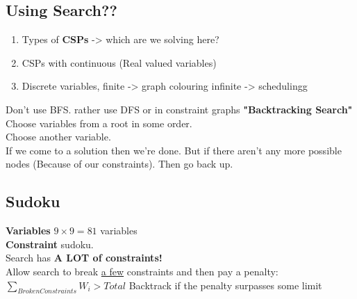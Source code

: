\documentclass{article}
\begin{document}
\subsection{Using Search??}
\begin{enumerate}
	\item Types of \textbf{CSPs} -> which are we solving here?
	\item CSPs with continuous (Real valued variables)
	\item Discrete variables, finite -> graph colouring infinite -> schedulingg
\end{enumerate}
Don't use BFS. rather use DFS or in constraint graphs \textbf{"Backtracking Search"}\\
Choose variables from a root in some order.\\
Choose another variable.\\
If we come to a solution then we're done. But if there aren't any more possible 
nodes (Because of our constraints). Then go back up.
\subsection{Sudoku}
\textbf{Variables} \- $9 \times 9 = 81$ variables\\
\textbf{Constraint} \- sudoku.\\
Search has \textbf{A LOT of constraints!}\\
Allow search to break \underline{a few} constraints and then pay a penalty: 
$\sum_{Broken Constraints} W_i > {Total}$ Backtrack if the penalty surpasses 
some limit
\end{document}
